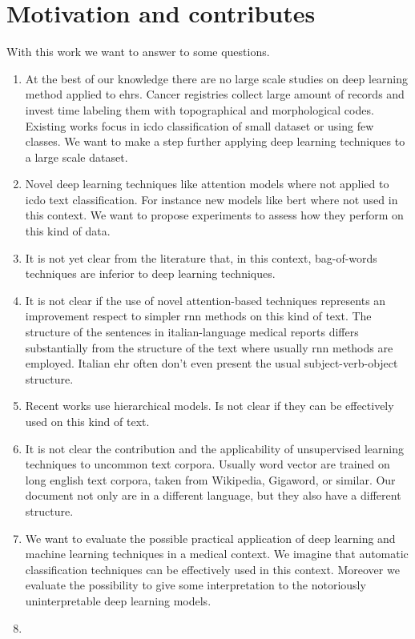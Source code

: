 \section{Motivation and contributes}
With this work we want to answer to some questions.
\begin{enumerate}
\item At the best of our
  knowledge there are no large scale studies on deep learning method
  applied to \acp{ehr}. Cancer registries collect large amount of
  records and invest time labeling them with topographical and
  morphological codes. Existing works focus in \ac{icdo} classification
  of small dataset or using few 
  classes. We want to make a step further applying deep learning
  techniques to a large scale dataset.
\item Novel deep learning techniques like attention models where not applied
  to \ac{icdo} text classification. For instance new models like
  \ac{bert} where not used in this context. We want to propose
  experiments to assess how they perform on this kind of data.
\item It is not yet clear from the literature that, in this context,
  bag-of-words techniques are inferior to deep learning techniques.
\item It is not clear if the use of novel attention-based techniques
  represents an improvement respect to simpler \ac{rnn} methods on this
  kind of text. The structure of the sentences in italian-language
  medical reports differs substantially from the structure of the text
  where usually \ac{rnn} methods are employed. Italian \ac{ehr} often
  don't even present the usual subject-verb-object structure.
\item Recent works use hierarchical models. Is not clear if they can
  be effectively used on this kind of text.
\item It is not clear the contribution and the applicability of
  unsupervised learning techniques to uncommon text corpora. Usually
  word vector are trained on long english text corpora, taken from
  Wikipedia, Gigaword, or similar. Our document not only are in a
  different language, but they also have a different structure.
\item We want to evaluate the possible practical application of deep
  learning and machine learning techniques in a medical context. We
  imagine that automatic classification techniques can be effectively
  used in this context. Moreover we evaluate the possibility to give
  some interpretation to the notoriously uninterpretable deep learning
  models. 
\item {}
\end{enumerate}

